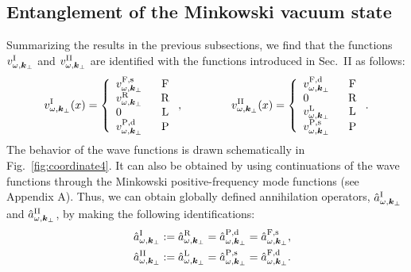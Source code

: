 \documentclass[aps,prd,preprintnumbers,nofootinbib,showpacs,11pt]{revtex4}%
\begin{document}
\begin{widetext}
\subsection{Entanglement of the Minkowski vacuum state \label{Sec:entanglement}}
Summarizing the results in the previous subsections, we find that 
the functions $v^{\rm I}_{\omega,\bm k_\perp}$ and $v^{\rm II}_{\omega,\bm k_\perp}$
are identified with the functions introduced in Sec.~II as follows:
\begin{eqnarray}
v_{\omega,\bm k_\perp}^{\rm I}(x)=\left\{
\begin{array}{lc}
v_{\omega,{\bm k}_\perp}^{{\rm F},{\rm s}} & ~~{\rm F}
\\
v^{\rm R}_{\omega,{\bm k}_\perp}& ~~{\rm R}
\\
0& ~~{\rm L}
\\
v_{\omega,{\bm k}_\perp}^{{\rm P},{\rm d}} & ~~{\rm P}
\end{array}
\right.,
~~~~~~~~~~~~~
v_{\omega,\bm k_\perp}^{\rm II}(x)=\left\{
\begin{array}{lc}
v_{\omega,{\bm k}_\perp}^{{\rm F},{\rm d}} & ~~{\rm F}
\\
0& ~~{\rm R}
\\
v^{\rm L}_{\omega,{\bm k}_\perp}& ~~{\rm L}
\\
v_{\omega,{\bm k}_\perp}^{{\rm P},{\rm s}} & ~~{\rm P}
\end{array}
\right..
\end{eqnarray}
The behavior of the wave functions is drawn schematically in Fig.~\ref{fig:coordinate4}.
It can also be obtained by using continuations of the 
wave functions through the Minkowski positive-frequency mode functions (see Appendix A).  
Thus, we can obtain globally defined annihilation operators, $\hat a^{\rm I}_{\omega,\bm k_\perp}$
and $\hat a^{\rm II}_{\omega,\bm k_\perp}$, by 
making the following identifications:
\begin{eqnarray}
 &&\hat a^{\rm I}_{\omega,\bm k_\perp} := \hat a^{\rm R}_{\omega,\bm k_\perp}
=\hat a^{{\rm P},{\rm d}}_{\omega,\bm k_\perp}
=\hat a^{{\rm F},{\rm s}}_{\omega,\bm k_\perp},
\nonumber\\
 &&\hat a^{\rm II}_{\omega,\bm k_\perp} := \hat a^{\rm L}_{\omega,\bm k_\perp}
=\hat a^{{\rm P},{\rm s}}_{\omega,\bm k_\perp}
=\hat a^{{\rm F},{\rm d}}_{\omega,\bm k_\perp}.
\nonumber
\end{eqnarray}

\end{widetext}
\end{document}

